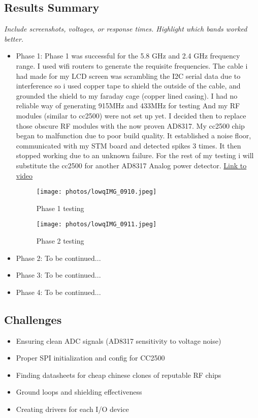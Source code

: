 \documentclass[12pt]{article}
\begin{document}
\subsection{Results Summary}
\textit{Include screenshots, voltages, or response times. Highlight which bands worked better.}
\begin{itemize}
    \item Phase 1: Phase 1 was successful for the 5.8 GHz and 2.4 GHz frequency range. I used wifi routers to generate the requisite frequencies. The cable i had made for my LCD screen was scrambling the I2C serial data due to interference so i used copper tape to shield the outside of the cable, and grounded the shield to my faraday cage (copper lined casing). I had no reliable way of generating 915MHz and 433MHz for testing And my RF modules (similar to cc2500) were not set up yet. I decided then to replace those obscure RF modules with the now proven AD8317. My cc2500 chip began to malfunction due to poor build quality. It established a noise floor, communicated with my STM board and detected spikes 3 times. It then stopped working due to an unknown failure. For the rest of my testing i will substitute the cc2500 for another AD8317 Analog power detector. 
    \href{https://github.com/corbinpro/dradar_proj}{Link to video}
    \begin{figure}[H]
    \centering
    \texttt{[image: photos/lowqIMG\_0910.jpeg]}
    \caption{Phase 1 testing}
    \end{figure}
    \begin{figure}[H]
    \centering
    \texttt{[image: photos/lowqIMG\_0911.jpeg]}
    \caption{Phase 2 testing}
    \end{figure}
    
    \item Phase 2: To be continued...
    \item Phase 3: To be continued...
    \item Phase 4: To be continued...
\end{itemize}

\subsection{Challenges}
\begin{itemize}
    \item Ensuring clean ADC signals (AD8317 sensitivity to voltage noise)
    \item Proper SPI initialization and config for CC2500
    \item Finding datasheets for cheap chinese clones of reputable RF chips
    \item Ground loops and shielding effectiveness
    \item Creating drivers for each I/O device
\end{itemize}
\end{document}
